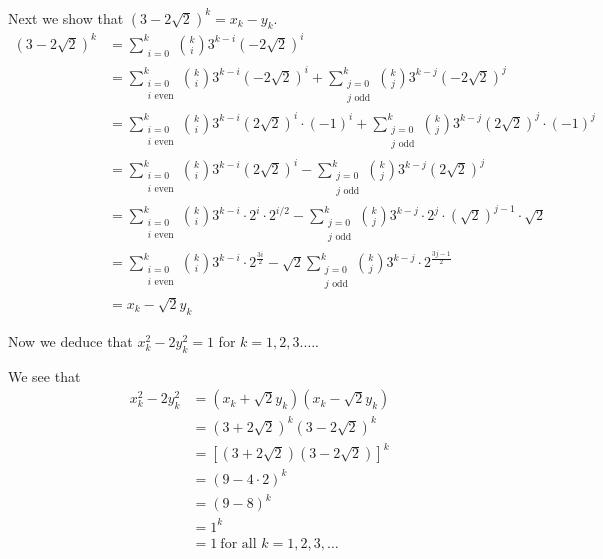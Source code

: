 \documentclass[12 pt]{amsart}
\begin{document}
  Next we show that $(3 - 2\sqrt{2})^k = x_k - y_k$.
  \begin{align*}
    (3 - 2 \sqrt{2})^k 
    &=
      \sum_{\substack{i = 0}}^k
        \binom{k}{i}
        3^{k-i}
        (-2\sqrt{2})^i \\
    &=
        \sum_{\substack{i = 0 \\ \text{$i$ even}}}^k
        \binom{k}{i}
        3^{k-i}
        (-2\sqrt{2})^i 
        +
        \sum_{\substack{j = 0 \\ \text{$j$ odd}}}^k
        \binom{k}{j}
        3^{k-j}
        (-2\sqrt{2})^j \\
    &=
        \sum_{\substack{i = 0 \\ \text{$i$ even}}}^k
        \binom{k}{i}
        3^{k-i}
        (2\sqrt{2})^i
        \cdot (-1)^i
        +
        \sum_{\substack{j = 0 \\ \text{$j$ odd}}}^k
        \binom{k}{j}
        3^{k-j}
        (2\sqrt{2})^j 
        \cdot
        (-1)^j
        \\
    &=
        \sum_{\substack{i = 0 \\ \text{$i$ even}}}^k
        \binom{k}{i}
        3^{k-i}
        (2\sqrt{2})^i
        -
        \sum_{\substack{j = 0 \\ \text{$j$ odd}}}^k
        \binom{k}{j}
        3^{k-j}
        (2\sqrt{2})^j \\
    &=
        \sum_{\substack{i = 0 \\ \text{$i$ even}}}^k
        \binom{k}{i}
        3^{k-i}
        \cdot
        2^i 
        \cdot
        2^{i/2} 
        -
        \sum_{\substack{j = 0 \\ \text{$j$ odd}}}^k
        \binom{k}{j}
        3^{k-j}
        \cdot
        2^j 
        \cdot
        (\sqrt{2})^{j-1} 
        \cdot
        \sqrt{2} \\
    &=
        \sum_{\substack{i = 0 \\ \text{$i$ even}}}^k
        \binom{k}{i}
        3^{k-i}
        \cdot
        2^{\frac{3i}{2}}
        -
        \sqrt{2}
        \sum_{\substack{j = 0 \\ \text{$j$ odd}}}^k
        \binom{k}{j}
        3^{k-j}
        \cdot
        2^{\frac{3j-1}{2}} \\
    &=
        x_k - \sqrt{2} y_k
  \end{align*}

  Now we deduce that $x_k^2 - 2y_k^2 = 1$ for 
  $k = 1,2,3. \ldots$. 

  We see that 
  \begin{align*}
    x_k^2 - 2y_k^2
    &=
      (x_k + \sqrt{2}y_k)
      (x_k - \sqrt{2}y_k) \\
    &=
      (3 + 2 \sqrt{2})^k
      (3 - 2 \sqrt{2})^k \\
    &=
      \left[
        (3 + 2 \sqrt{2})
        (3 - 2 \sqrt{2})
      \right]^k \\
    &=
      (9 - 4 \cdot 2)^k  \\
    &=
      (9 - 8)^k \\
    &=
      1^k \\
    &=
      1\ \text{for all $k = 1,2,3,\ldots$}
  \end{align*}
\end{document}
